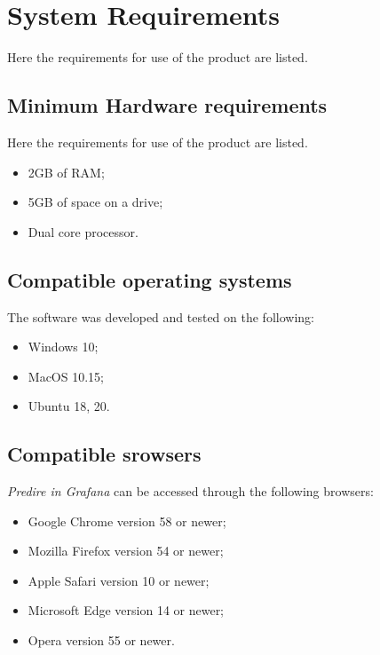 \section{System Requirements}
Here the requirements for use of the product are listed.

\subsection{Minimum Hardware requirements}
Here the requirements for use of the product are listed.
\begin{itemize}
	\item 2GB of RAM;
	\item 5GB of space on a drive;
	\item Dual core processor.	
\end{itemize}

\subsection{Compatible operating systems}
The software was developed and tested on the following:
\begin{itemize}
	\item Windows 10;
	\item MacOS 10.15;
	\item Ubuntu 18, 20.
\end{itemize}

\subsection{Compatible srowsers}
\textit{Predire in Grafana} can be accessed through the following browsers:
\begin{itemize}
	\item Google Chrome version 58 or newer;
	\item Mozilla Firefox version 54 or newer;
	\item Apple Safari version 10 or newer;
	\item Microsoft Edge version 14 or newer;
	\item Opera version 55 or newer.
\end{itemize}



